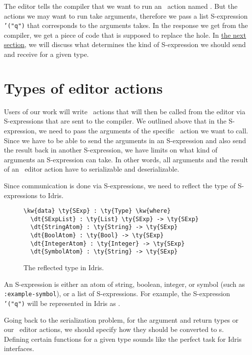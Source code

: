 The editor tells the compiler that we want to run an \Elab\ action named
. But the actions we may want to run take arguments, therefore we
pass a list S-expression \texttt{'("q")} that corresponds to the arguments
 takes.
In the response we get from the compiler, we get a piece of code that is
supposed to replace the hole. In \hyperref[sec:types]{the next section}, we
will discuss what determines the kind of S-expression we should send and
receive for a given type.

\section{Types of editor actions}\label{sec:types}

Users of our work will write \Elab\ actions that will then be called from the
editor via S-expressions that are sent to the compiler. We outlined above that
in the S-expression, we need to pass the arguments of the specific
\Elab\ action we want to call. Since we have to be able to send the arguments
in an S-expression and also send the result back in another S-expression, we
have limits on what kind of arguments an S-expression can take.
In other words, all arguments and the result of an \Elab\ editor action
have to serializable and deserializable.

Since communication is done via S-expressions, we need to reflect the type of
\mbox{S-expressions} to Idris.

\begin{figure}[ht]
  \caption{The reflected type  in Idris.}
  \label{code:definitionSExp}
\begin{Verbatim}[framesep=2mm, label=\footnotesize{\normalfont{Idris}}, labelposition=topline]
\kw{data} \ty{SExp} : \ty{Type} \kw{where}
  \dt{SExpList} : \ty{List} \ty{SExp} -> \ty{SExp}
  \dt{StringAtom} : \ty{String} -> \ty{SExp}
  \dt{BoolAtom} : \ty{Bool} -> \ty{SExp}
  \dt{IntegerAtom} : \ty{Integer} -> \ty{SExp}
  \dt{SymbolAtom} : \ty{String} -> \ty{SExp}
\end{Verbatim}
\end{figure}

An S-expression is either an atom of string, boolean, integer, or symbol (such
as \texttt{:example-symbol}), or a list of S-expressions.
For example, the S-expression \texttt{'("q")} will be represented in Idris as
\mbox{}.

Going back to the serialization problem, for the argument and return types or
our \Elab\ editor actions, we should specify how they should be converted to
s.  Defining certain functions for a given type sounds like the
perfect task for Idris interfaces.

